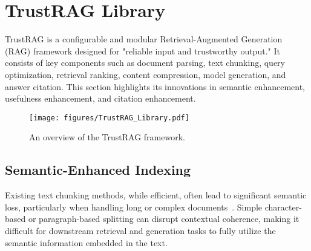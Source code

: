 \section{TrustRAG Library}
TrustRAG is a configurable and modular Retrieval-Augmented Generation (RAG) framework designed for "reliable input and trustworthy output." It consists of key components such as document parsing, text chunking, query optimization, retrieval ranking, content compression, model generation, and answer citation. This section highlights its innovations in semantic enhancement, usefulness enhancement, and citation enhancement.

\begin{figure}[!t]
\centering
\texttt{[image: figures/TrustRAG\_Library.pdf]}
\caption{An overview of the TrustRAG framework.}
\label{fig:trustrag_overview}
\end{figure}

% 

\subsection{Semantic-Enhanced Indexing}
Existing text chunking methods, while efficient, often lead to significant semantic loss, particularly when handling long or complex documents~\cite{sarthi2024raptor}. Simple character-based or paragraph-based splitting can disrupt contextual coherence, making it difficult for downstream retrieval and generation tasks to fully utilize the semantic information embedded in the text. 

